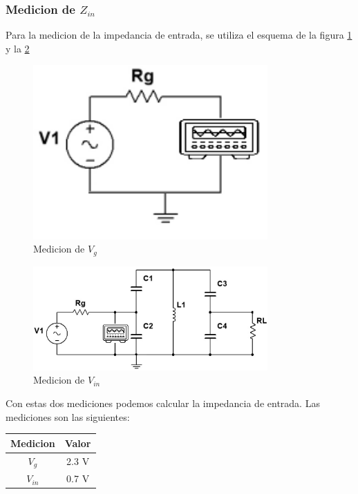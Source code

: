 \subsubsection{Medicion de $Z_{in}$}

Para la medicion de la impedancia de entrada, se utiliza el esquema de la figura \ref{fig: de la medicion de la impedancia de entrada}
y la \ref{fig: de la medicion de la impedancia de entrada 2}

\begin{figure}[h]
    \centering
    \includegraphics[width=0.8\textwidth]{Imagenes/medicion_zin1.png}
    \caption{Medicion de $V_g$}
    \label{fig: de la medicion de la impedancia de entrada}
\end{figure}

\newpage

\begin{figure}[h]
    \centering
    \includegraphics[width=0.8\textwidth]{Imagenes/medicion_zin2.png}
    \caption{Medicion de $V_{in}$}
    \label{fig: de la medicion de la impedancia de entrada 2}
\end{figure}

Con estas dos mediciones podemos calcular la impedancia de entrada. Las mediciones son las siguientes:
\begin{table}[h]
    \centering
    \begin{tabular}{|c|c|}
    \hline
    \rowcolor[HTML]{C0C0C0} 
    \textbf{Medicion} & \textbf{Valor} \\ \hline
    $V_g$            & 2.3  V         \\ \hline
    $V_{in}$         & 0.7 V         \\ \hline
    \end{tabular}
\end{table}

